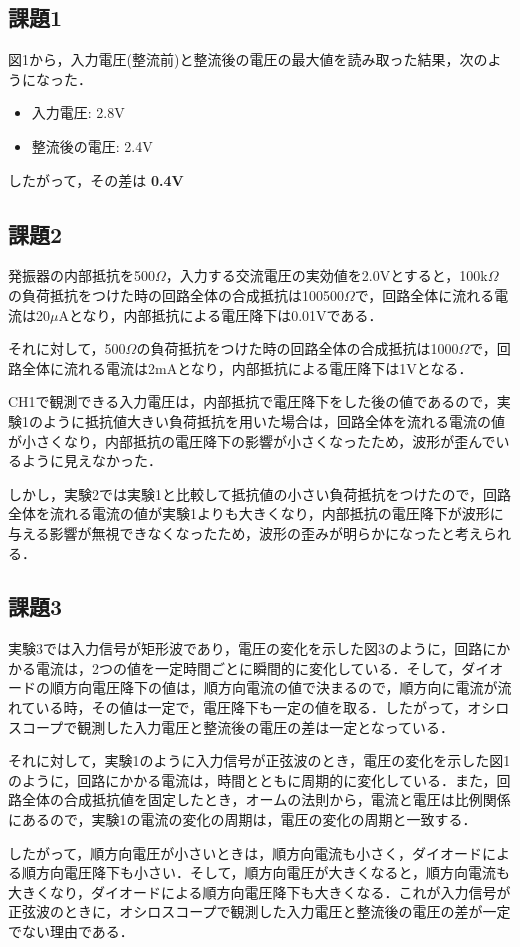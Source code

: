 \documentclass[titlepage,a4paper,11pt]{jsarticle}
\def\tightlist{\itemsep1pt\parskip0pt\parsep0pt}
\begin{document}
\subsection{課題1}

図1から，入力電圧(整流前)と整流後の電圧の最大値を読み取った結果，次のようになった．

\begin{itemize}
    \tightlist
  \item
    入力電圧: 2.8V
  \item
    整流後の電圧: 2.4V
\end{itemize}

したがって，その差は \textbf{0.4V}

\subsection{課題2}

発振器の内部抵抗を500\(\Omega\)，入力する交流電圧の実効値を2.0Vとすると，100k\(\Omega\)の負荷抵抗をつけた時の回路全体の合成抵抗は100500\(\Omega\)で，回路全体に流れる電流は20\(\mu\)Aとなり，内部抵抗による電圧降下は0.01Vである．

それに対して，500\(\Omega\)の負荷抵抗をつけた時の回路全体の合成抵抗は1000\(\Omega\)で，回路全体に流れる電流は2mAとなり，内部抵抗による電圧降下は1Vとなる．

CH1で観測できる入力電圧は，内部抵抗で電圧降下をした後の値であるので，実験1のように抵抗値大きい負荷抵抗を用いた場合は，回路全体を流れる電流の値が小さくなり，内部抵抗の電圧降下の影響が小さくなったため，波形が歪んでいるように見えなかった．

しかし，実験2では実験1と比較して抵抗値の小さい負荷抵抗をつけたので，回路全体を流れる電流の値が実験1よりも大きくなり，内部抵抗の電圧降下が波形に与える影響が無視できなくなったため，波形の歪みが明らかになったと考えられる．

\subsection{課題3}

実験3では入力信号が矩形波であり，電圧の変化を示した図3のように，回路にかかる電流は，2つの値を一定時間ごとに瞬間的に変化している．そして，ダイオードの順方向電圧降下の値は，順方向電流の値で決まるので，順方向に電流が流れている時，その値は一定で，電圧降下も一定の値を取る．したがって，オシロスコープで観測した入力電圧と整流後の電圧の差は一定となっている．

それに対して，実験1のように入力信号が正弦波のとき，電圧の変化を示した図1のように，回路にかかる電流は，時間とともに周期的に変化している．また，回路全体の合成抵抗値を固定したとき，オームの法則から，電流と電圧は比例関係にあるので，実験1の電流の変化の周期は，電圧の変化の周期と一致する．

したがって，順方向電圧が小さいときは，順方向電流も小さく，ダイオードによる順方向電圧降下も小さい．そして，順方向電圧が大きくなると，順方向電流も大きくなり，ダイオードによる順方向電圧降下も大きくなる．これが入力信号が正弦波のときに，オシロスコープで観測した入力電圧と整流後の電圧の差が一定でない理由である．
\end{document}
